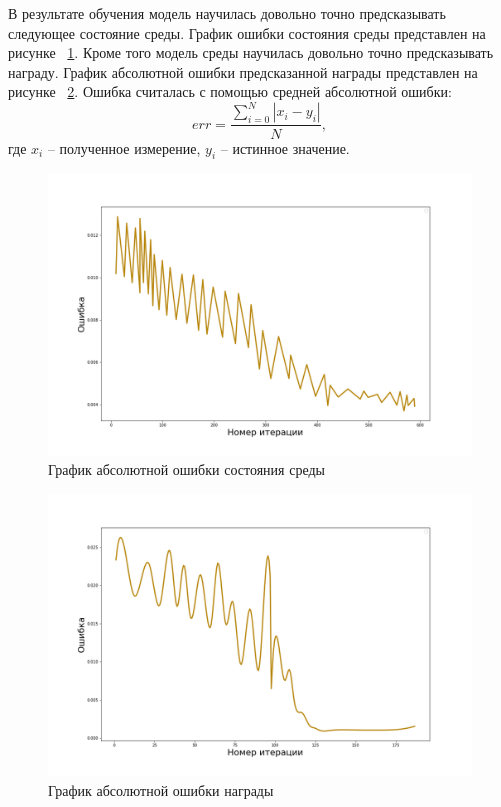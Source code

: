 В результате обучения модель научилась довольно точно предсказывать следующее состояние среды. График ошибки состояния среды представлен на рисунке ~\ref{fig:obs}. Кроме того модель среды научилась довольно точно предсказывать награду. График абсолютной ошибки предсказанной награды представлен на рисунке ~\ref{fig:rew-err}. Ошибка считалась с помощью средней абсолютной ошибки:
\begin{equation}
	err = \dfrac{\sum\limits_{i=0}^N |x_i - y_i|}{N},
	\label{eq:err}
\end{equation}
где $x_i$ -- полученное измерение, $y_i$ -- истинное значение.
\begin{figure}[!htb]
	\centering
	\includegraphics[scale=0.44]{obs.png}
	\caption {График абсолютной ошибки состояния среды}
	\label{fig:obs}
\end{figure}



\begin{figure}[!htb]
	\centering
	\includegraphics[scale=0.44]{rew_err.png}
	\caption {График абсолютной ошибки награды}
	\label{fig:rew-err}
\end{figure}

